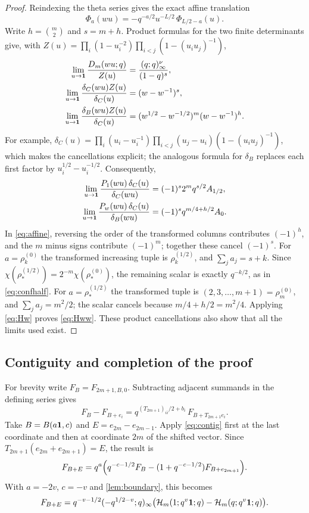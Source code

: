 \begin{proof}
Reindexing the theta series gives the exact affine translation
\begin{equation}\label{eq:affine}
\Phi_a(wu)=-q^{-a/2}u^{-L/2}\,\Phi_{L/2-a}(u).
\end{equation}
Write $h=\binom m2$ and $s=m+h$. Product formulas for the two finite determinants give, with $Z(u)=\prod_i(1-u_i^{-2})\prod_{i<j}(1-(u_iu_j)^{-1})$,
\begin{align*}
\lim_{u\to\mathbf{1}}\frac{D_m(wu;q)}{Z(u)}&=\frac{(q;q)_\infty^\nu}{(1-q)^s},\\
\lim_{u\to\mathbf{1}}\frac{\delta_C(wu)Z(u)}{\delta_C(u)}&=(w-w^{-1})^s,\\
\lim_{u\to\mathbf{1}}\frac{\delta_B(wu)Z(u)}{\delta_C(u)}&=(w^{1/2}-w^{-1/2})^m(w-w^{-1})^h.
\end{align*}
For example, $\delta_C(u)=\prod_i(u_i-u_i^{-1})\prod_{i<j}(u_j-u_i)(1-(u_iu_j)^{-1})$, which makes the cancellations explicit; the analogous formula for $\delta_B$ replaces each first factor by $u_i^{1/2}-u_i^{-1/2}$. Consequently,
\begin{align*}
\lim_{u\to\mathbf{1}}\frac{P_1(wu)\,\delta_C(u)}{\delta_C(wu)}&=(-1)^s2^mq^{s/2}A_{1/2},\\
\lim_{u\to\mathbf{1}}\frac{P_w(wu)\,\delta_C(u)}{\delta_B(wu)}&=(-1)^sq^{m/4+h/2}A_0.
\end{align*}
In \eqref{eq:affine}, reversing the order of the transformed columns contributes $(-1)^h$, and the $m$ minus signs contribute $(-1)^m$; together these cancel $(-1)^s$. For $a=\rho^{(0)}_k$ the transformed increasing tuple is $\rho^{(1/2)}_k$, and $\sum_ja_j=s+k$. Since $\chi(\rho^{(1/2)}_*)=2^{-m}\chi(\rho^{(0)}_*)$, the remaining scalar is exactly $q^{-k/2}$, as in \eqref{eq:confhalf}. For $a=\rho^{(1/2)}_*$ the transformed tuple is $(2,3,\dots,m+1)=\rho^{(0)}_m$, and $\sum_ja_j=m^2/2$; the scalar cancels because $m/4+h/2=m^2/4$. Applying \eqref{eq:Hw} proves \eqref{eq:Hww}. These product cancellations also show that all the limits used exist.
\end{proof}

\subsection{Contiguity and completion of the proof}
For brevity write $F_B=F_{2m+1,B,0}$. Subtracting adjacent summands in the defining series gives
\begin{equation}\label{eq:contig}
F_B-F_{B+e_i}=q^{(T_{2m+1})_{ii}/2+b_i}\,F_{B+T_{2m+1}e_i}.
\end{equation}
Take $B=B(a\mathbf{1},c)$ and $E=e_{2m}-e_{2m-1}$. Apply \eqref{eq:contig} first at the last coordinate and then at coordinate $2m$ of the shifted vector. Since $T_{2m+1}(e_{2m}+e_{2m+1})=E$, the result is
\[
F_{B+E}=q^a\Bigl(q^{-c-1/2}F_B-(1+q^{-c-1/2})F_{B+e_{2m+1}}\Bigr).
\]
With $a=-2v$, $c=-v$ and \cref{lem:boundary}, this becomes
\begin{equation}\label{eq:contig2}
F_{B+E}=q^{-v-1/2}(-q^{1/2-v};q)_\infty\bigl(\mathcal{H}_m(1;q^v\mathbf{1};q)-\mathcal{H}_m(q;q^v\mathbf{1};q)\bigr).
\end{equation}

